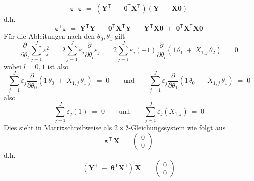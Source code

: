 \begin{equation}
\boldsymbol{\varepsilon}^\mathsf{T}  \boldsymbol{\varepsilon} \; = \;
\left(
\mathbf{Y}^\mathsf{T}
\; - \;
\boldsymbol{\theta}^\mathsf{T} \mathbf{X}^\mathsf{T} \right)
\left(
\mathbf{Y}
\; - \;
\mathbf{X} \boldsymbol{\theta} \right)
\end{equation}
d.h.
\begin{equation}
\boldsymbol{\varepsilon}^\mathsf{T}  \boldsymbol{\varepsilon} \; = \;
\mathbf{Y}^\mathsf{T} \mathbf{Y}
\; - \;
\boldsymbol{\theta}^\mathsf{T} \mathbf{X}^\mathsf{T}  \mathbf{Y}
\; - \;
\mathbf{Y}^\mathsf{T}  \mathbf{X} \boldsymbol{\theta}
\; + \;
\boldsymbol{\theta}^\mathsf{T} \mathbf{X}^\mathsf{T} \mathbf{X} \boldsymbol{\theta}
\end{equation}
Für die Ableitungen nach den $\theta_0, \theta_1$ gilt
\begin{equation}
\frac{\partial}{\partial \theta_l} \sum_{j=1}^J \varepsilon_j^2 \; = \;
2 \sum_{j=1}^J \varepsilon_j \frac{\partial}{\partial \theta_l} \varepsilon_j \; = \;
2 \sum_{j=1}^J \varepsilon_j (-1) \frac{\partial}{\partial \theta_l}(1 \, \theta_1 \; + \;  X_{1,j} \, \theta_2) \; = \; 0
\end{equation}
wobei $l = 0,1$ ist also
\begin{equation}
\sum_{j=1}^J \varepsilon_j  \frac{\partial}{\partial \theta_0}(1 \, \theta_0 \; + \;  X_{1,j} \, \theta_1)  \; = \; 0 \qquad \mathrm{und} \qquad
\sum_{j=1}^J \varepsilon_j  \frac{\partial}{\partial \theta_1}(1 \, \theta_0 \; + \;  X_{1,j} \, \theta_1)  \; = \; 0
\end{equation}
also
\begin{equation}
\sum_{j=1}^J \varepsilon_j (1) \; = \; 0 \qquad \mathrm{und}  \qquad
\sum_{j=1}^J \varepsilon_j ( X_{1,j})  \; = \; 0
\end{equation}
Dies sieht in Matrixschreibweise als $2 \times 2$-Gleichungssystem wie folgt aus
\begin{equation}
\boldsymbol{\varepsilon}^\mathsf{T} \, \mathbf{X} \; = \;
\left(
\begin{array}{c}
0\\
0
\end{array}
\right)
\end{equation}
d.h.
\begin{equation}
\left(\mathbf{Y}^\mathsf{T}
\; - \;
\boldsymbol{\theta}^\mathsf{T} \mathbf{X}^\mathsf{T} \right) \, \mathbf{X} \; = \;
\left(
\begin{array}{c}
0\\
0
\end{array}
\right)
\end{equation}
